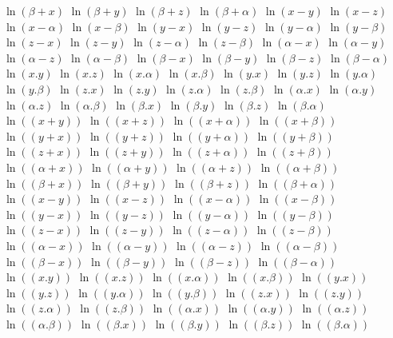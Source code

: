 $ \ln(\beta + x) $
$ \ln(\beta + y) $
$ \ln(\beta + z) $
$ \ln(\beta + \alpha) $
$ \ln(x - y) $
$ \ln(x - z) $
$ \ln(x - \alpha) $
$ \ln(x - \beta) $
$ \ln(y - x) $
$ \ln(y - z) $
$ \ln(y - \alpha) $
$ \ln(y - \beta) $
$ \ln(z - x) $
$ \ln(z - y) $
$ \ln(z - \alpha) $
$ \ln(z - \beta) $
$ \ln(\alpha - x) $
$ \ln(\alpha - y) $
$ \ln(\alpha - z) $
$ \ln(\alpha - \beta) $
$ \ln(\beta - x) $
$ \ln(\beta - y) $
$ \ln(\beta - z) $
$ \ln(\beta - \alpha) $
$ \ln(x . y) $
$ \ln(x . z) $
$ \ln(x . \alpha) $
$ \ln(x . \beta) $
$ \ln(y . x) $
$ \ln(y . z) $
$ \ln(y . \alpha) $
$ \ln(y . \beta) $
$ \ln(z . x) $
$ \ln(z . y) $
$ \ln(z . \alpha) $
$ \ln(z . \beta) $
$ \ln(\alpha . x) $
$ \ln(\alpha . y) $
$ \ln(\alpha . z) $
$ \ln(\alpha . \beta) $
$ \ln(\beta . x) $
$ \ln(\beta . y) $
$ \ln(\beta . z) $
$ \ln(\beta . \alpha) $
$ \ln((x + y)) $
$ \ln((x + z)) $
$ \ln((x + \alpha)) $
$ \ln((x + \beta)) $
$ \ln((y + x)) $
$ \ln((y + z)) $
$ \ln((y + \alpha)) $
$ \ln((y + \beta)) $
$ \ln((z + x)) $
$ \ln((z + y)) $
$ \ln((z + \alpha)) $
$ \ln((z + \beta)) $
$ \ln((\alpha + x)) $
$ \ln((\alpha + y)) $
$ \ln((\alpha + z)) $
$ \ln((\alpha + \beta)) $
$ \ln((\beta + x)) $
$ \ln((\beta + y)) $
$ \ln((\beta + z)) $
$ \ln((\beta + \alpha)) $
$ \ln((x - y)) $
$ \ln((x - z)) $
$ \ln((x - \alpha)) $
$ \ln((x - \beta)) $
$ \ln((y - x)) $
$ \ln((y - z)) $
$ \ln((y - \alpha)) $
$ \ln((y - \beta)) $
$ \ln((z - x)) $
$ \ln((z - y)) $
$ \ln((z - \alpha)) $
$ \ln((z - \beta)) $
$ \ln((\alpha - x)) $
$ \ln((\alpha - y)) $
$ \ln((\alpha - z)) $
$ \ln((\alpha - \beta)) $
$ \ln((\beta - x)) $
$ \ln((\beta - y)) $
$ \ln((\beta - z)) $
$ \ln((\beta - \alpha)) $
$ \ln((x . y)) $
$ \ln((x . z)) $
$ \ln((x . \alpha)) $
$ \ln((x . \beta)) $
$ \ln((y . x)) $
$ \ln((y . z)) $
$ \ln((y . \alpha)) $
$ \ln((y . \beta)) $
$ \ln((z . x)) $
$ \ln((z . y)) $
$ \ln((z . \alpha)) $
$ \ln((z . \beta)) $
$ \ln((\alpha . x)) $
$ \ln((\alpha . y)) $
$ \ln((\alpha . z)) $
$ \ln((\alpha . \beta)) $
$ \ln((\beta . x)) $
$ \ln((\beta . y)) $
$ \ln((\beta . z)) $
$ \ln((\beta . \alpha)) $
